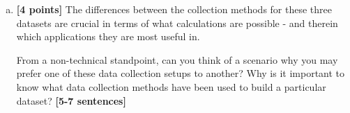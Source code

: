 \begin{enumerate}[(a)]

\item \textbf{[4 points]}
The differences between the collection methods for these three datasets are crucial in terms of what calculations are possible - and therein which applications they are most useful in.
\begin{tcolorbox}[colback=orange!5!white,colframe=orange!75!black] 
 From a non-technical standpoint, can you think of a scenario why you may prefer one of these data collection setups to another? Why is it important to know what data collection methods have been used to build a particular dataset? \textbf{[5-7 sentences]}
\end{tcolorbox}
\end{enumerate}










